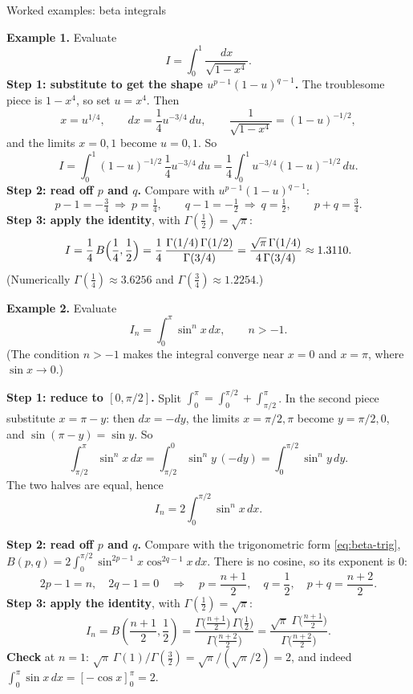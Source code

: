 \documentclass[11pt]{beamer}
\begin{document}
\begin{frame}[allowframebreaks=1.00]{Worked examples: beta integrals}
\footnotesize

\textbf{Example 1.} Evaluate
\[
  I=\int_0^1\frac{dx}{\sqrt{1-x^4}}.
\]
\textbf{Step 1: substitute to get the shape \(u^{p-1}(1-u)^{q-1}\).} The troublesome piece is
\(1-x^4\), so set \(u=x^4\). Then
\[
  x=u^{1/4},
  \qquad
  dx=\frac14u^{-3/4}\,du,
  \qquad
  \frac1{\sqrt{1-x^4}}=(1-u)^{-1/2},
\]
and the limits \(x=0,1\) become \(u=0,1\). So
\[
  I=\int_0^1(1-u)^{-1/2}\,\frac14u^{-3/4}\,du=\frac14\int_0^1u^{-3/4}(1-u)^{-1/2}\,du .
\]
\textbf{Step 2: read off \(p\) and \(q\).} Compare with \(u^{p-1}(1-u)^{q-1}\):
\[
  p-1=-\tfrac34\ \Rightarrow\ p=\tfrac14,\qquad
  q-1=-\tfrac12\ \Rightarrow\ q=\tfrac12,\qquad
  p+q=\tfrac34 .
\]
\textbf{Step 3: apply the identity}, with \(\Gamma(\frac12)=\sqrt\pi\):
\begin{equation}
  I=\frac14\,B\Bigl(\frac14,\frac12\Bigr)
   =\frac14\,\frac{\Gamma(1/4)\,\Gamma(1/2)}{\Gamma(3/4)}
   =\frac{\sqrt\pi\,\Gamma(1/4)}{4\,\Gamma(3/4)}\approx1.3110 .
  \label{eq:beta-ex1}
\end{equation}
(Numerically \(\Gamma(\frac14)\approx3.6256\) and \(\Gamma(\frac34)\approx1.2254\).)
\par\framebreak\par
\textbf{Example 2.} Evaluate
\[
  I_n=\int_0^\pi\sin^n x\,dx,
  \qquad n>-1 .
\]
(The condition \(n>-1\) makes the integral converge near \(x=0\) and \(x=\pi\), where \(\sin x\to0\).)

\textbf{Step 1: reduce to \([0,\pi/2]\).} Split \(\int_0^\pi=\int_0^{\pi/2}+\int_{\pi/2}^{\pi}\). In the
second piece substitute \(x=\pi-y\): then \(dx=-dy\), the limits \(x=\pi/2,\pi\) become
\(y=\pi/2,0\), and \(\sin(\pi-y)=\sin y\). So
\[
  \int_{\pi/2}^{\pi}\sin^nx\,dx=\int_{\pi/2}^{0}\sin^ny\,(-dy)=\int_0^{\pi/2}\sin^ny\,dy .
\]
The two halves are equal, hence
\[
  I_n=2\int_0^{\pi/2}\sin^n x\,dx .
\]
\par\framebreak\par
\textbf{Step 2: read off \(p\) and \(q\).} Compare with the trigonometric form
\eqref{eq:beta-trig}, \(B(p,q)=2\int_0^{\pi/2}\sin^{2p-1}x\cos^{2q-1}x\,dx\). There is no cosine, so
its exponent is \(0\):
\[
 2p-1=n,\quad 2q-1=0
 \quad\Longrightarrow\quad p=\frac{n+1}{2},\quad q=\frac12,\quad p+q=\frac{n+2}{2}.
\]
\textbf{Step 3: apply the identity}, with \(\Gamma(\frac12)=\sqrt\pi\):
\begin{equation}
 I_n=B\left(\frac{n+1}{2},\frac12\right)
 =\frac{\Gamma\bigl(\frac{n+1}2\bigr)\,\Gamma\bigl(\frac12\bigr)}{\Gamma\bigl(\frac{n+2}2\bigr)}
 =\frac{\sqrt\pi\;\Gamma\bigl(\frac{n+1}2\bigr)}{\Gamma\bigl(\frac{n+2}2\bigr)}.
 \label{eq:beta-ex2}
\end{equation}
\textbf{Check} at \(n=1\): \(\sqrt\pi\,\Gamma(1)/\Gamma(\frac32)=\sqrt\pi/(\sqrt\pi/2)=2\), and indeed
\(\int_0^\pi\sin x\,dx=[-\cos x]_0^\pi=2\).
\end{frame}
\end{document}
